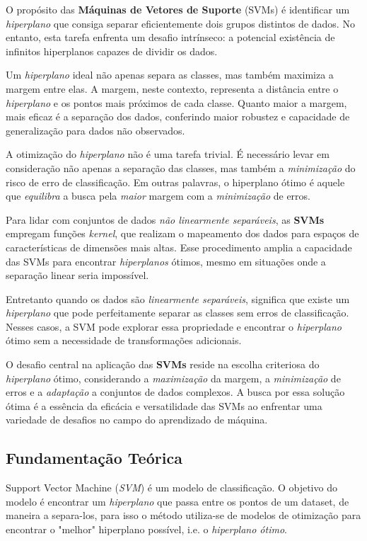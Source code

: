 \documentclass{article}
\begin{document}
O propósito das \textbf{Máquinas de Vetores de Suporte} (SVMs) é identificar um \textit{hiperplano} que consiga separar eficientemente dois grupos distintos de dados. No entanto, esta tarefa enfrenta um desafio intrínseco: a potencial existência de infinitos hiperplanos capazes de dividir os dados.

Um \textit{hiperplano} ideal não apenas separa as classes, mas também maximiza a margem entre elas. A margem, neste contexto, representa a distância entre o \textit{hiperplano} e os pontos mais próximos de cada classe. Quanto maior a margem, mais eficaz é a separação dos dados, conferindo maior robustez e capacidade de generalização para dados não observados.

A otimização do \textit{hiperplano} não é uma tarefa trivial. É necessário levar em consideração não apenas a separação das classes, mas também a \textit{minimização} do risco de erro de classificação. Em outras palavras, o hiperplano ótimo é aquele que \textit{equilibra} a busca pela \textit{maior} margem com a \textit{minimização} de erros.

Para lidar com conjuntos de dados \textit{não linearmente separáveis}, as \textbf{SVMs} empregam funções \textit{kernel}, que realizam o mapeamento dos dados para espaços de características de dimensões mais altas. Esse procedimento amplia a capacidade das SVMs para encontrar \textit{hiperplanos} ótimos, mesmo em situações onde a separação linear seria impossível.

Entretanto quando os dados são \textit{linearmente separáveis}, significa que existe um \textit{hiperplano} que pode perfeitamente separar as classes sem erros de classificação. Nesses casos, a SVM pode explorar essa propriedade e encontrar o \textit{hiperplano} ótimo sem a necessidade de transformações adicionais.

O desafio central na aplicação das \textbf{SVMs} reside na escolha criteriosa do \textit{hiperplano} ótimo, considerando a \textit{maximização} da margem, a \textit{minimização} de erros e a \textit{adaptação} a conjuntos de dados complexos. A busca por essa solução ótima é a essência da eficácia e versatilidade das SVMs ao enfrentar uma variedade de desafios no campo do aprendizado de máquina.

\subsection{Fundamentação Teórica}
Support Vector Machine (\textit{SVM}) é um modelo de classificação.
O objetivo do modelo é encontrar um \textit{hiperplano} que passa entre os pontos de um dataset, de maneira a separa-los, para isso o método utiliza-se de modelos de otimização para encontrar o "melhor" hiperplano possível, i.e. o \textit{hiperplano ótimo}. 
\end{document}
